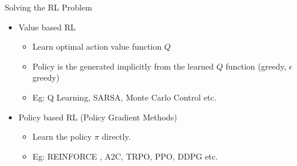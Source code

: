 \begin{frame}{Solving the RL Problem}
\begin{itemize}
    \item Value based RL
    \begin{itemize}
        \item Learn optimal action value function $Q$
        \item Policy is the generated implicitly from the learned $Q$ function (greedy, $\epsilon$ greedy)
        \item Eg: Q Learning, SARSA, Monte Carlo Control etc.
    \end{itemize}
    \item Policy based RL (Policy Gradient Methods)
    \begin{itemize}
        \item Learn the policy $\pi$ directly.
        \item Eg: REINFORCE , A2C, TRPO, PPO, DDPG etc.   
    \end{itemize}
\end{itemize}
    
\end{frame}
